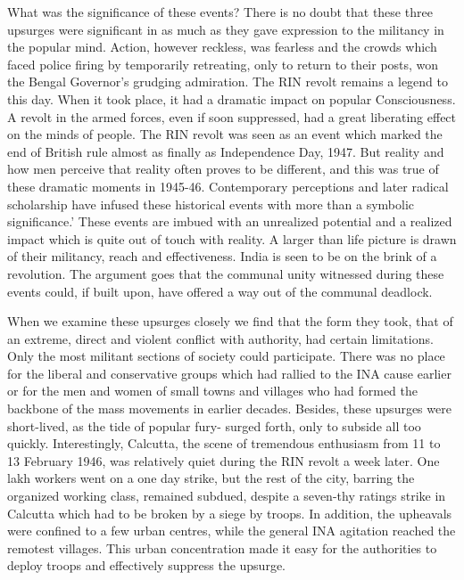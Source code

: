What was the significance of these events? There is no doubt that these three upsurges were significant in as much as they gave expression to the militancy in the popular mind. Action, however reckless, was fearless and the crowds which faced police firing by temporarily retreating, only to return to their posts, won the Bengal Governor’s grudging admiration. The RIN revolt remains a legend to this day. When it took place, it had a dramatic impact on popular Consciousness. A revolt in the armed forces, even if soon suppressed, had a great liberating effect on the minds of people. The RIN revolt was seen as an event which marked the end of British rule almost as finally as Independence Day, 1947. But reality and how men perceive that reality often proves to be different, and this was true of these dramatic moments in 1945-46. Contemporary perceptions and later radical scholarship have infused these historical events with more than a symbolic significance.’ These events are imbued with an unrealized potential and a realized impact which is quite out of touch with reality. A larger than life picture is drawn of their militancy, reach and effectiveness. India is seen to be on the brink of a revolution. The argument goes that the communal unity witnessed during these events could, if built upon, have offered a way out of the communal deadlock. 

When we examine these upsurges closely we find that the form they took, that of an extreme, direct and violent conflict with authority, had certain limitations. Only the most militant sections of society could participate. There was no place for the liberal and conservative groups which had rallied to the INA cause earlier or for the men and women of small towns and villages who had formed the backbone of the mass movements in earlier decades. Besides, these upsurges were short-lived, as the tide of popular fury- surged forth, only to subside all too quickly. Interestingly, Calcutta, the scene of tremendous enthusiasm from 11 to 13 February 1946, was relatively quiet during the RIN revolt a week later. One lakh workers went on a one day strike, but the rest of the city, barring the organized working class, remained subdued, despite a seven-thy ratings strike in Calcutta which had to be broken by a siege by troops. In addition, the upheavals were confined to a few urban centres, while the general INA agitation reached the remotest villages. This urban concentration made it easy for the authorities to deploy troops and effectively suppress the upsurge. 

